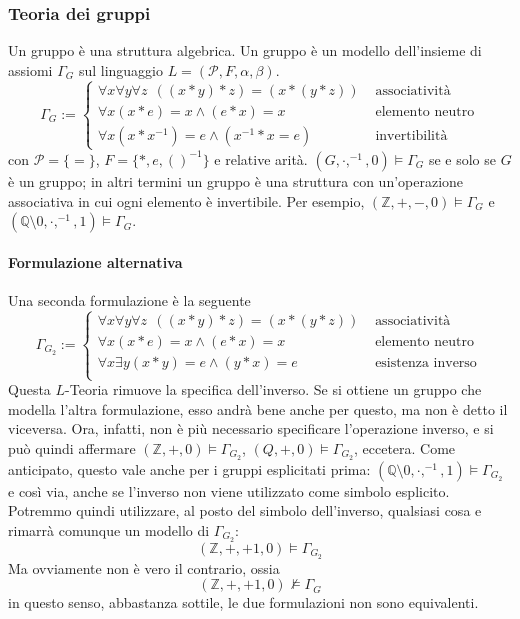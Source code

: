 \subsubsection{Teoria dei gruppi}
Un gruppo è una struttura algebrica. 
Un gruppo è un modello dell'insieme di assiomi $\Gamma_G$ sul linguaggio 
$L = (\mathcal{P}, F, \alpha, \beta)$. 
$$
\Gamma_G := 
        \begin{cases}
                \forall x \forall y \forall z  ~~ ((x * y)*z) = (x*(y*z))  & \text{ associatività}\\
                \forall x (x * e) = x \land (e * x) = x  & \text{ elemento neutro}\\
                \forall x (x * x^{-1}) = e \land (x^{-1} * x = e) & \text{ invertibilità}
        \end{cases}
$$
con $\mathcal{P} = \{ = \}$, $F = \{*, e, ()^{-1}\}$ e relative 
arità. 
$(G, \cdot, ^{-1}, 0) \models \Gamma_G$ se e solo se $G$ è un gruppo; in 
altri termini un gruppo è una struttura con un'operazione associativa in cui 
ogni elemento è invertibile. 
Per esempio, $(\mathbb{Z}, +, -, 0) \models \Gamma_G$ e 
$(\mathbb{Q}\setminus{0}, \cdot, ^{-1}, 1) \models \Gamma_G$. 

\paragraph{Formulazione alternativa}
Una seconda formulazione è la seguente
$$
        \Gamma_{G_2} := 
                \begin{cases}
                        \forall x \forall y \forall z  ~~ ((x * y)*z) = (x*(y*z)) & \text{ associatività}\\
                        \forall x (x * e) = x \land (e * x) = x & \text{ elemento neutro } \\
                        \forall x \exists y (x * y) = e \land (y * x) = e & \text{ esistenza inverso} \\
                \end{cases}
$$
Questa $L$-Teoria rimuove la specifica dell'inverso. Se si ottiene un gruppo 
che modella l'altra formulazione, esso andrà bene anche per questo, ma non è detto 
il viceversa. 
Ora, infatti, non è più necessario specificare l'operazione inverso, 
e si può quindi affermare $(\mathbb{Z}, +, 0) \models \Gamma_{G_2}$, $(Q, +, 0) \models \Gamma_{G_2}$, 
eccetera. Come anticipato, questo vale anche per i gruppi esplicitati prima: 
$(\mathbb{Q}\setminus{0}, \cdot, ^{-1}, 1) \models \Gamma_{G_2}$ e così via, 
anche se l'inverso non viene utilizzato come simbolo esplicito. 
Potremmo quindi utilizzare, al posto del simbolo dell'inverso, qualsiasi cosa e 
rimarrà comunque un modello di $\Gamma_{G_2}$: 
$$
(\mathbb{Z}, +, +1, 0) \models \Gamma_{G_2}
$$
Ma ovviamente non è vero il contrario, ossia 
$$
(\mathbb{Z}, +, +1, 0) \nvDash \Gamma_G
$$
in questo senso, abbastanza sottile, le due formulazioni non sono equivalenti. 
